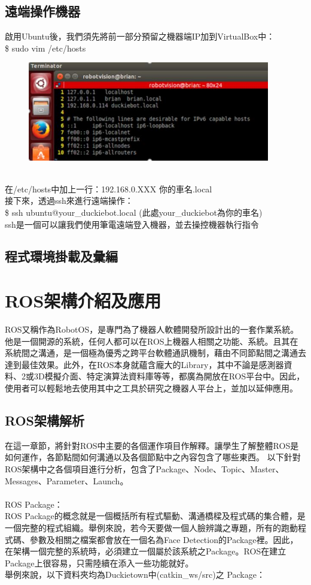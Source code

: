 \documentclass{article}
\begin{document}
\subsection{遠端操作機器}
啟用Ubuntu後，我們須先將前一部分預留之機器端IP加到VirtualBox中：
\\\$ sudo vim /etc/hosts
\begin{figure}[htp]
    \begin{center}
        \includegraphics[width=300pt]{pic/圖片16.jpg}
    \end{center}
\end{figure}
\\在/etc/hosts中加上一行：192.168.0.XXX 你的車名.local
\\接下來，透過ssh來進行遠端操作：
\\\$ ssh ubuntu@your\_duckiebot.local     (此處your\_duckiebot為你的車名)
\\ssh是一個可以讓我們使用筆電遠端登入機器，並去操控機器執行指令

\subsection{程式環境掛載及彙編}

\section{ROS架構介紹及應用}
ROS又稱作為RobotOS，是專門為了機器人軟體開發所設計出的一套作業系統。他是一個開源的系統，任何人都可以在ROS上機器人相關之功能、系統。且其在系統間之溝通，是一個極為優秀之跨平台軟體通訊機制，藉由不同節點間之溝通去達到最佳效果。此外，在ROS本身就蘊含龐大的Library，其中不論是感測器資料、2或3D模擬介面、特定演算法資料庫等等，都廣為開放在ROS平台中。因此，使用者可以輕鬆地去使用其中之工具於研究之機器人平台上，並加以延伸應用。

\subsection{ROS架構解析}
在這一章節，將針對ROS中主要的各個運作項目作解釋。讓學生了解整體ROS是如何運作，各節點間如何溝通以及各個節點中之內容包含了哪些東西。
以下針對ROS架構中之各個項目進行分析，包含了Package、Node、Topic、Master、Messages、Parameter、Launch。
\\
\\ROS Package：
\\ROS Package的概念就是一個概括所有程式驅動、溝通橋樑及程式碼的集合體，是一個完整的程式組織。舉例來說，若今天要做一個人臉辨識之專題，所有的跑動程式碼、參數及相關之檔案都會放在一個名為Face Detection的Package裡。因此，在架構一個完整的系統時，必須建立一個屬於該系統之Package。ROS在建立Package上很容易，只需陸續在添入一些功能就好。
\\舉例來說，以下資料夾均為Duckietown中(catkin_ws/src)之 Package：
\end{document}
